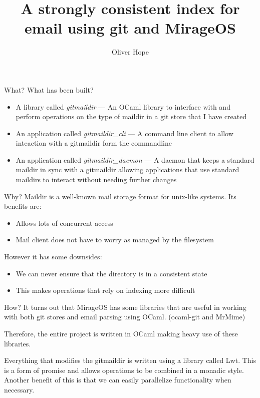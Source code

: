\documentclass{beamer}
\title{A strongly consistent index for email using git and MirageOS}
\date{}
\author{Oliver Hope}
\institute{Jesus College}
\begin{document}
  \maketitle

  \begin{frame}[fragile]{What?}
    What has been built?

    \begin{itemize}
      \item A library called \emph{gitmaildir} --- An OCaml library to interface with and perform operations on the type of maildir in a git store that I have created
      \item An application called \emph{gitmaildir\_cli} --- A command line client to allow inteaction with a gitmaildir form the commandline
      \item An application called \emph{gitmaildir\_daemon} --- A daemon that keeps a standard maildir in sync with a gitmaildir allowing applications that use standard maildirs to interact without needing further changes
    \end{itemize}
  \end{frame}

  \begin{frame}{Why?}
    Maildir is a well-known mail storage format for unix-like systems. Its benefits are:
    \begin{itemize}
      \item Allows lots of concurrent access
      \item Mail client does not have to worry as managed by the filesystem
    \end{itemize}
    However it has some downsides:
    \begin{itemize}
      \item We can never ensure that the directory is in a consistent state
      \item This makes operations that rely on indexing more difficult
    \end{itemize}
  \end{frame}

  \begin{frame}{How?}
    It turns out that MirageOS has some libraries that are useful in working with both git stores and email parsing using OCaml. (ocaml-git and MrMime)

    Therefore, the entire project is written in OCaml making heavy use of these libraries.

    Everything that modifies the gitmaildir is written using a library called Lwt. This is a form of promise and allows operations to be combined in a monadic style. Another benefit of this is that we can easily parallelize functionality when necessary.
  \end{frame}
\end{document}
